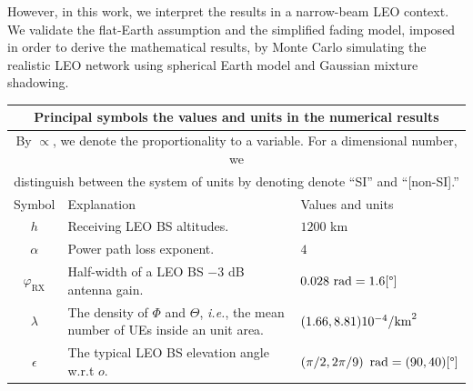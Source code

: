 \documentclass[lettersize,journal]{IEEEtran}
\newcommand{\rEarth}{R_{\oplus}}
\newcommand{\R}{\mathbb{R}}
\begin{document}
 However, in this work, we interpret the results in a narrow-beam LEO context. We validate the flat-Earth assumption and the simplified fading model, imposed in order to derive the mathematical results, by Monte Carlo simulating the realistic LEO network using spherical Earth model and Gaussian mixture shadowing.








\begin{table}
  \begin{center}
    \begin{tabular}{|c|p{4.5cm}|p{1.9cm}|}
      \multicolumn{3}{c}{\textbf{Principal symbols the values and units in the numerical results}} \\
      \toprule
      \multicolumn{3}{|c|}{\scriptsize{By $\propto$, we denote the proportionality to a variable. For a dimensional number, we}} \\
      \multicolumn{3}{|c|}{\scriptsize{distinguish between the system of units by denoting denote ``SI'' and ``[non-SI].'' }} \\ 
      \hline
      Symbol& Explanation &Values and units
      \\ 
      \hline 
      $h$ & Receiving LEO BS altitudes. &$1200$ km  \\
      $\alpha$ &Power path loss exponent.& $4$\\
      $\varphi_{\text{RX}}$ & Half-width of a LEO BS $-3$ dB antenna gain.&$0.028 \text{ rad}\break =1.6[\degree]$ \\
      $\lambda$ & The density of $\Phi$ and $\Theta$, \textit{i.e.}, the mean number of UEs inside an unit area.&$(1.66,8.81)\break10^{-4}\text{/km}^2$\\
      $\epsilon$& The typical LEO BS elevation angle w.r.t $\textit{o}$.&$\left({\pi}/{2},{2\pi}/{9}\right)\text{ rad}\break=(90,40)[\degree]$\\

\end{tabular}
\end{center}
\end{table}
\end{document}
